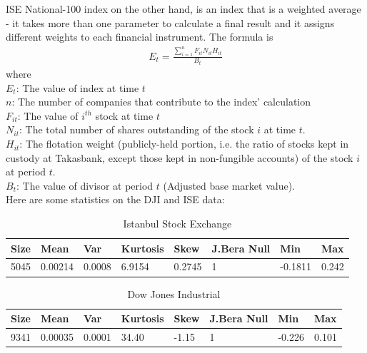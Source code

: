 ISE National-100 index on the other hand, is an index that is a weighted average
- it takes more than one parameter to calculate a final result and it assigns
different weights to each financial instrument. The formula is
\begin{eqnarray*}
E_t = \frac{\sum_{i=1}^n F_{it} N_{it} H_{it}}{B_t}
\end{eqnarray*}
where\\
$E_t$: The value of index at time $t$\\
$n$: The number of companies that contribute to the index' calculation\\
$F_{it}$: The value of $i^{th}$ stock at time $t$\\
$N_{it}$: The total number of shares outstanding of the stock $i$ at time $t$. \\
$H_{it}$: The flotation weight (publicly-held portion, i.e. the ratio of stocks
kept in custody at Takasbank, except those kept in non-fungible accounts) of the
stock $i$ at period $t$. \\
$B_t$: The value of divisor at period $t$ (Adjusted base market value). \\

Here are some statistics on the DJI and ISE data:

\vspace{0.3cm}

\begin{table}[!h]
\caption{Istanbul Stock Exchange}
\vspace{0.3cm}
\begin{tabular}{|l|l|l|l|l|l|l|l|}
\hline
Size & Mean & Var & Kurtosis & Skew & J.Bera Null & Min & Max \\
\hline
5045 & 0.00214 & 0.0008 &     6.9154 &     0.2745 &  1 & -0.1811 & 0.242 \\
\hline
\end{tabular}
\end{table}

\vspace{0.3cm}

\begin{table}[!h]
\caption{Dow Jones Industrial}
\vspace{0.3cm}
\begin{tabular}{|l|l|l|l|l|l|l|l|}
\hline
Size & Mean & Var & Kurtosis & Skew & J.Bera Null & Min & Max \\
\hline
9341 & 0.00035 & 0.0001 &    34.40 &    -1.15 &     1 &    -0.226 & 0.101 \\
\hline
\end{tabular}
\end{table}

